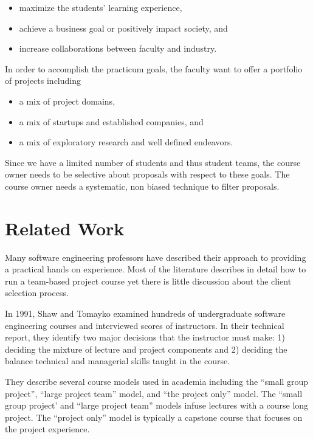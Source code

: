 \documentclass[conference]{IEEEtran}
\begin{document}
\begin{itemize}
\itemsep1pt\parskip0pt
\item
  maximize the students' learning experience, 
\item
  achieve a business goal or positively impact society, and
\item
  increase collaborations between faculty and industry. 
\end{itemize}

In order to accomplish the practicum goals, the faculty want to offer
a portfolio of projects including

\begin{itemize}
\itemsep1pt\parskip0pt
\item
  a mix of project domains,
\item
  a mix of startups and established companies, and 
\item
  a mix of exploratory research and well defined
  endeavors.
\end{itemize}

Since we have a limited number of students and thus student teams, the
course owner needs to be selective about proposals with respect to these
goals. The course owner needs a systematic, non biased technique to
filter proposals.

\section{Related Work}
\label{Related Work}
Many software engineering professors have described their approach to providing a practical hands on experience. Most of the literature describes in detail how to run a team-based project course yet there is little discussion about the client selection process. 

In 1991, Shaw and Tomayko \cite{shaw1991models} examined hundreds of undergraduate software engineering courses and interviewed scores of instructors. In their technical report, they identify two major decisions that the instructor must make: 1) deciding the mixture of lecture and project components and 2) deciding the balance technical and managerial skills taught in the course. 

They describe several course models used in academia including the ``small group project'', ``large project team'' model, and  ``the project only'' model. The ``small group project' and  ``large project team'' models infuse lectures with a course long project. The ``project only'' model is typically a capstone course that focuses on the project experience.
\end{document}
